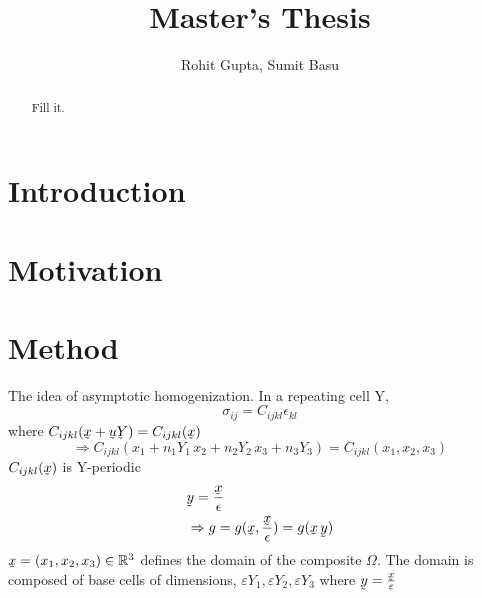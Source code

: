 \documentclass[10pt]{article}
\begin{document}
\title{Master's Thesis}
\author{Rohit Gupta, Sumit Basu}

\maketitle

\begin{abstract}
Fill it.
\end{abstract}

\section{Introduction}

\section{Motivation}

\section{Method}
The idea of asymptotic homogenization.
In a repeating cell Y,
\begin{equation}
	\label{First}
	\sigma_{ij} = C_{ijkl}\epsilon_{kl}	
\end{equation}
where $C_{ijkl}(\underaccent{\tilde}{x}+\underaccent{\tilde}{u}\underaccent{\tilde}{Y})=C_{ijkl}(\underaccent{\tilde}{x})$
\begin{equation}
\Rightarrow C_{ijkl}(x_1+n_1Y_1\, x_2+n_2Y_2\,x_3+n_3Y_3) = C_{ijkl}(x_1,x_2,x_3)
\end{equation}
$C_{ijkl}(\underaccent{\tilde}{x}) $ is Y-periodic
\begin{eqnarray}
&\underaccent{\tilde}{y} = \frac{\underaccent{\tilde}{x}}{\epsilon}\\
&\Rightarrow g = g(\underaccent{\tilde}{x},\frac{\underaccent{\tilde}{x}}{\epsilon}) = g(\underaccent{\tilde}{x} \,\underaccent{\tilde}{y})
\end{eqnarray}
$\underaccent{\tilde}{x} = (x_1, x_2, x_3) \in \mathbb{R}^3$ defines the domain of the composite $\Omega$. The domain is composed of base cells of dimensions, $\varepsilon Y_1 , \varepsilon Y_2,\varepsilon Y_3$ where $\underaccent{\tilde}{y}=\frac{\underaccent{\tilde}{x}}{\varepsilon}$
\end{document}
